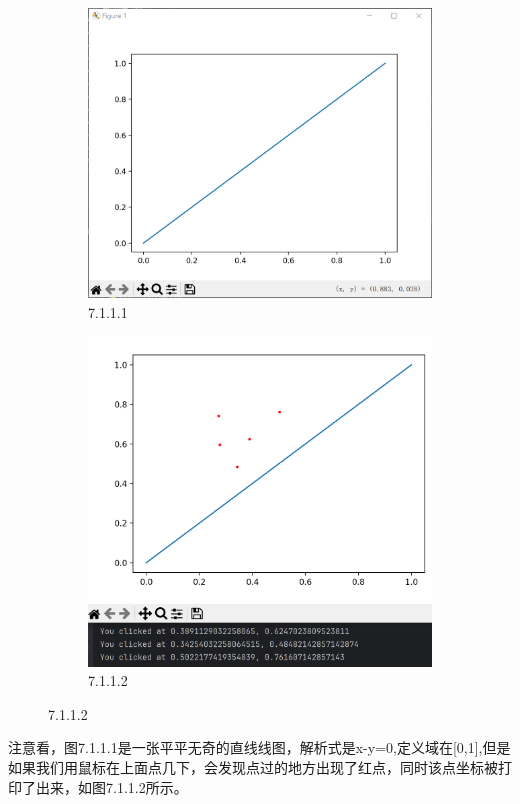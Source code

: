 \documentclass[12pt]{article}
\begin{document}
\begin{figure}[H]
    \centering
    \begin{subfigure}[b]{0.45\textwidth}
        \includegraphics[width=\textwidth]{交互 Pic1.png} %
        \caption{7.1.1.1}
        \label{fig:line-graph2}
    \end{subfigure}
    \hfill
    \begin{subfigure}[b]{0.45\textwidth}
        \includegraphics[width=\textwidth]{交互 Pic1.2.png} %
        \caption{7.1.1.2}
        \label{fig:line-graph2-pic2}
    \end{subfigure}
\end{figure}
注意看，图7.1.1.1是一张平平无奇的直线线图，解析式是x-y=0,定义域在[0,1],但是如果我们用鼠标在上面点几下，会发现点过的地方出现了红点，同时该点坐标被打印了出来，如图7.1.1.2所示。
\end{document}
